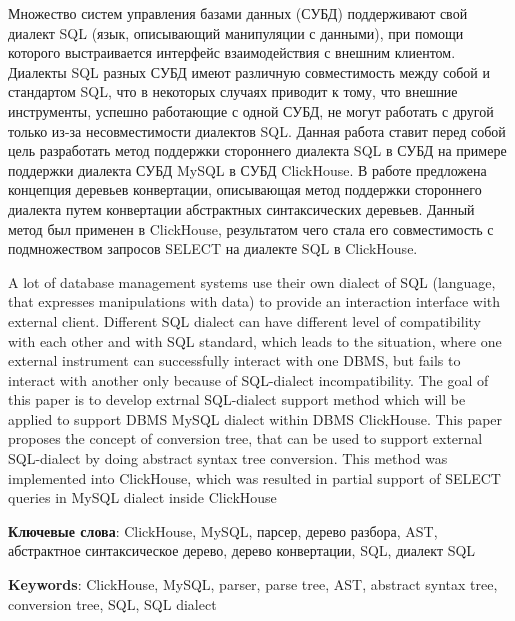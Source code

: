 Множество систем управления базами данных (СУБД) поддерживают свой диалект SQL (язык, описывающий манипуляции с данными), при помощи которого выстраивается интерфейс взаимодействия с внешним клиентом. Диалекты SQL разных СУБД имеют различную совместимость между собой и стандартом SQL, что в некоторых случаях приводит к тому, что внешние инструменты, успешно работающие с одной СУБД, не могут работать с другой только из-за несовместимости диалектов SQL. Данная работа ставит перед собой цель разработать метод поддержки стороннего диалекта SQL в СУБД на примере поддержки диалекта СУБД MySQL в СУБД ClickHouse. В работе предложена концепция деревьев конвертации, описывающая метод поддержки стороннего диалекта путем конвертации абстрактных синтаксических деревьев. Данный метод был применен в ClickHouse, результатом чего стала его совместимость с подмножеством запросов SELECT на диалекте SQL в ClickHouse.


A lot of database management systems use their own dialect of SQL (language, that expresses manipulations with data) to provide an interaction interface with external client. Different SQL dialect can have different level of compatibility with each other and with SQL standard, which leads to the situation, where one external instrument can successfully interact with one DBMS, but fails to interact with another only because of SQL-dialect incompatibility. The goal of this paper is to develop extrnal SQL-dialect support method which will be applied to support DBMS MySQL dialect within DBMS ClickHouse. This paper proposes the concept of conversion tree, that can be used to support external SQL-dialect by doing abstract syntax tree conversion. This method was implemented into ClickHouse, which was resulted in partial support of SELECT queries in MySQL dialect inside ClickHouse

\textbf{Ключевые слова}: ClickHouse, MySQL, парсер, дерево разбора, AST, абстрактное синтаксическое дерево, дерево конвертации, SQL, диалект SQL

\textbf{Keywords}: ClickHouse, MySQL, parser, parse tree, AST, abstract syntax tree, conversion tree, SQL, SQL dialect
